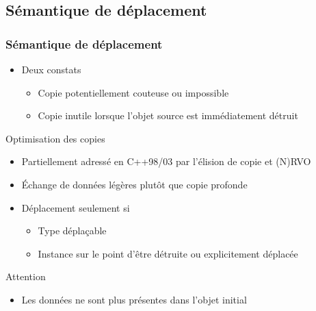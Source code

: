 \documentclass[C++.tex]{subfiles}
\begin{document}
\subsection*{Sémantique de déplacement}
\begin{frame}
	\frametitle{Sémantique de déplacement}
	\begin{itemize}
		\item Deux constats
		\begin{itemize}
			\item Copie potentiellement couteuse ou impossible


			\item Copie inutile lorsque l'objet source est immédiatement détruit
		\end{itemize}
	\end{itemize}

	\begin{block}{Optimisation des copies}
		\begin{itemize}
			\item Partiellement adressé en C++98/03 par l'élision de copie et (N)RVO
		\end{itemize}
	\end{block}

	\begin{itemize}
		\item Échange de données légères plutôt que copie profonde
		\item Déplacement seulement si
		\begin{itemize}
			\item Type déplaçable
			\item Instance sur le point d'être détruite ou explicitement déplacée
		\end{itemize}
	\end{itemize}

	\begin{alertblock}{Attention}
		\begin{itemize}
			\item Les données ne sont plus présentes dans l'objet initial
		\end{itemize}
	\end{alertblock}
\end{frame}
\end{document}
